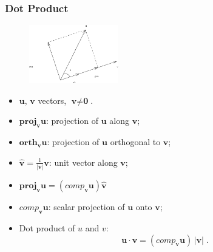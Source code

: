 
\begin{frame}
 \frametitle{Dot Product}

\begin{figure}[h]
  \includegraphics[height=1in]{../../modules/vectors/pictures/ok-dot_product.eps}
\end{figure}

\begin{itemize}
\item $\textbf{u}$, $\textbf{v}$ vectors, $\textbf{v}\neq \textbf{0}$.

\item $\textbf{proj}_{\bm{v}} \textbf{u}$: projection of $\textbf{u}$ along $\textbf{v}$;

  \item $\textbf{orth}_{\bm{v}} \textbf{u}$: projection of $\textbf{u}$ orthogonal to $\textbf{v}$;

  \item $\hat{\textbf{v}} = \frac{1}{|\textbf{v}|} \textbf{v}$: unit vector along $\textbf{v}$;

  \item $\textbf{proj}_{\bm{v}} \textbf{u} = (comp_{\bm{v}} \textbf{u}) \hat{\textbf{v}}$

  \item $comp_{\bm{v}} \textbf{u}$: scalar projection of $\textbf{u}$ onto $\textbf{v}$;

  \item Dot product of $u$ and $v$:
%
$$\textbf{u} \cdot \textbf{v} = (comp_{\bm{v}} \textbf{u}) \, |\textbf{v}|\; .$$
\end{itemize}

\end{frame}